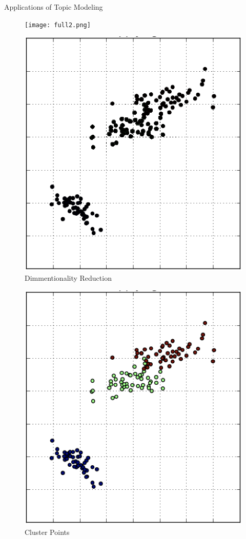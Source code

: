 \documentclass[10pt]{beamer}
\begin{document}
\begin{frame}{Applications of Topic Modeling}

  \begin{multicols}{4}

  \begin{figure}
  \texttt{[image: full2.png]}

  \includegraphics[width=.8\columnwidth]{reduced.png}
  \caption{Dimmentionality Reduction}
  \end{figure}
  \columnbreak

  \hfill
    \begin{figure}
  \includegraphics[width=\columnwidth]{cluster.png}
  \caption{Cluster Points}
  \end{figure}
    \columnbreak


\end{multicols}
\end{frame}
\end{document}
